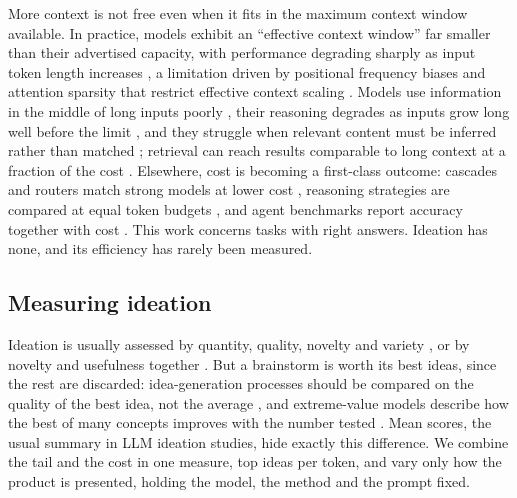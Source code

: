 More context is not free even when it fits in the maximum context window available. In practice, models exhibit an ``effective context window'' far smaller than their advertised capacity, with performance degrading sharply as input token length increases \citep{Paulsen2026}, a limitation driven by positional frequency biases and attention sparsity that restrict effective context scaling \citep{An2024}. Models use information in the middle of long inputs poorly \citep{Liu2024}, their reasoning degrades as inputs grow long well before the limit \citep{Levy2024}, and they struggle when relevant content must be inferred rather than matched \citep{Modarressi2025}; retrieval can reach results comparable to long context at a fraction of the cost \citep{Li2024}. Elsewhere, cost is becoming a first-class outcome: cascades and routers match strong models at lower cost \citep{Chen2024d,Ong2024,Ding2024}, reasoning strategies are compared at equal token budgets \citep{Wang2024,Han2025}, and agent benchmarks report accuracy together with cost \citep{Kapoor2025,Wang2025}. This work concerns tasks with right answers. Ideation has none, and its efficiency has rarely been measured.

\subsection{Measuring ideation}

Ideation is usually assessed by quantity, quality, novelty and variety \citep{Shah2003}, or by novelty and usefulness together \citep{Sarkar2011}. But a brainstorm is worth its best ideas, since the rest are discarded: idea-generation processes should be compared on the quality of the best idea, not the average \citep{Girotra2010}, and extreme-value models describe how the best of many concepts improves with the number tested \citep{Dahan2001}. Mean scores, the usual summary in LLM ideation studies, hide exactly this difference. We combine the tail and the cost in one measure, top ideas per token, and vary only how the product is presented, holding the model, the method and the prompt fixed.
